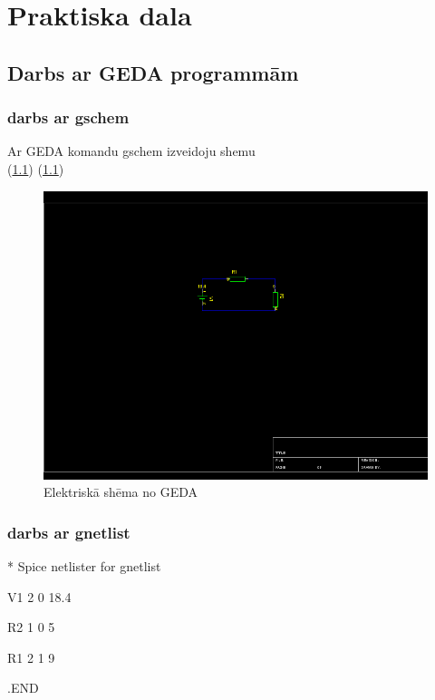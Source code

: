 \documentclass{report}
\begin{document}
\chapter{Praktiska dala}
\section{Darbs ar GEDA programmām}
\subsection{darbs ar gschem}
Ar GEDA komandu gschem izveidoju shemu\\(\ref{GEDA Shema})
(\ref{GEDA Shema})
\begin{figure}[!tb]
\includegraphics[width=\textwidth,height=\textheight,keepaspectratio]{IMAGES/01.png}
\caption{Elektriskā shēma no GEDA}
\label{GEDA Shema}
\end{figure}
\subsection{darbs ar gnetlist}
\begin{flushleft}
* Spice netlister for gnetlist

V1  2   0   18.4

R2  1   0   5

R1  2   1   9

.END
\end{flushleft}
\end{document}
